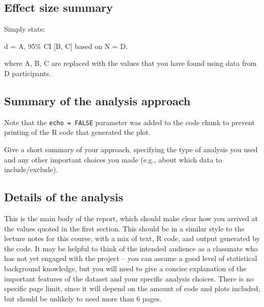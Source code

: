 \documentclass[
]{article}
\begin{document}
\subsection{Effect size summary}\label{effect-size-summary-1}

Simply state:

d = A, 95\% CI {[}B, C{]} based on N = D.

where A, B, C are replaced with the values that you have found using
data from D participants.

\subsection{Summary of the analysis
approach}\label{summary-of-the-analysis-approach-1}

Note that the \texttt{echo\ =\ FALSE} parameter was added to the code
chunk to prevent printing of the R code that generated the plot.

Give a short summary of your approach, specifying the type of analysis
you used and any other important choices you made (e.g., about which
data to include/exclude).

\subsection{Details of the analysis}\label{details-of-the-analysis-1}

This is the main body of the report, which should make clear how you
arrived at the values quoted in the first section. This should be in a
similar style to the lecture notes for this course, with a mix of text,
R code, and output generated by the code. It may be helpful to think of
the intended audience as a classmate who has not yet engaged with the
project -- you can assume a good level of statistical background
knowledge, but you will need to give a concise explanation of the
important features of the dataset and your specific analysis choices.
There is no specific page limit, since it will depend on the amount of
code and plots included, but should be unlikely to need more than 6
pages.
\end{document}
